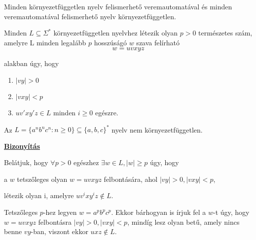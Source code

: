 \documentclass[10pt]{article}
\renewcommand{\\}{\par\noindent}
\begin{document}
\begin{frame}
\begin{tcolorbox}[squeezed title={Tétel: Környezetfüggetlen nyelv és veremautomata}]
Minden környezetfüggetlen nyelv felismerhető veremautomatával és minden veremautomatával felismerhető nyelv környezetfüggetlen.
\end{tcolorbox}

\begin{tcolorbox}[title={Tétel: Pumpáló lemma környezetfüggetlen nyelvre}]
Minden $L \subseteq {\Sigma}^*$ környezetfüggetlen nyelvhez létezik olyan $p > 0$ természetes szám, amelyre L minden legalább $p$ hosszúságó $w$ szava felírható $$w = uvxyz$$\\
alakban úgy, hogy\\
\begin{enumerate}
\item $|vy| > 0$
\item $|vxy| < p$
\item $uv'xy'z \in L$ minden $i \geq 0$ egészre.
\end{enumerate}

\end{tcolorbox}
\end{frame}

\begin{frame}
\begin{tcolorbox}[title={Tétel: Példa nem környezetfüggetlen nyelvre 1}]
Az $L = \{a^nb^nc^n : n \geq 0 \} \subseteq \{a, b, c\}^*$ nyelv nem környezetfüggetlen.\\
\tcblower
\smallskip
\underline{\textbf{Bizonyítás}}\\
\medskip
\\
Belátjuk, hogy ${\forall}p > 0$ egészhez ${\exists}w \in L, |w| \geq p$ úgy, hogy\\
a $w$ tetszőleges olyan $w = uvxyz$ felbontására, ahol $|vy| > 0, |vxy| < p$,\\
létezik olyan i, amelyre $uv^ixy^iz \notin L$.\\
\bigskip
Tetszőleges $p$-hez legyen $w = a^pb^pc^p$. Ekkor bárhogyan is írjuk fel a $w$-t úgy, hogy $w = uvxyz$ felbontásra $|vy| > 0, |vxy| < p$, mindíg lesz olyan betű, amely nincs benne $vy$-ban, viszont ekkor $uxz \notin L$.
\end{tcolorbox}
\end{frame}
\end{document}
